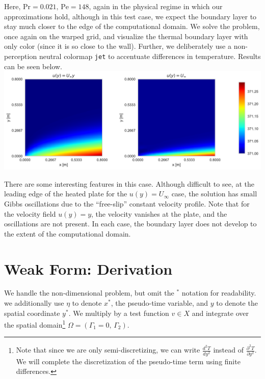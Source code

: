 \documentclass[10pt]{article}
\newcommand{\Pra}{\text{Pr}}
\newcommand{\Pe}{\text{Pe}}
\begin{document}
  Here, $\Pra = 0.021,\, \Pe = 148$, again in the physical regime in which our approximations
  hold, although in this test case, we expect the boundary layer to stay much closer to the edge of
  the computational domain. We solve the problem, once again on the warped grid, and visualize the
  thermal boundary layer with only color (since it is so close to the wall). Further, we
  deliberately use a non-perception neutral colormap \texttt{jet} to accentuate differences in
  temperature.  Results can be seen below. \\

  \includegraphics[width=\textwidth]{img/molten_lead_BL.pdf}

  There are some interesting features in this case. Although difficult to see, at the leading edge
  of the heated plate for the $u(y) = U_\infty$ case, the solution has small Gibbs oscillations due to the
  ``free-slip'' constant velocity profile. Note that for the velocity field $u(y) = y$, the velocity
  vanishes at the plate, and the oscillations are not present. In each case, the boundary layer does
  not develop to the extent of the computational domain.

\appendix
\section{Weak Form: Derivation} \label{app:wkder}

  We handle the non-dimensional problem, but omit the $^*$ notation for readability. we additionally
  use $\eta$ to denote $x^*$, the pseudo-time variable, and $y$ to denote the spatial coordinate
  $y^*$. We multiply by a test function $v \in X$ and integrate over the spatial domain\footnote{%
    Note that since we are only semi-discretizing, we can write $\frac{d^2 T}{dy^2}$ instead of 
    $\frac{\partial^2 T}{\partial y^2}$. We will complete the discretization of the pseudo-time term
    using finite differences.
  } $\Omega = (\Gamma_1 = 0,\, \Gamma_2)$. \\
\end{document}
